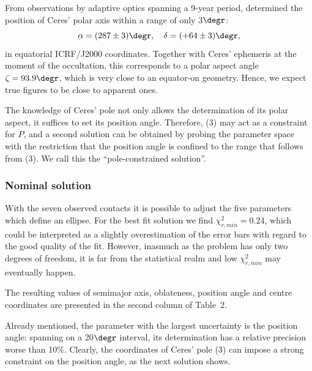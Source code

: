 \documentclass[useAMS,usenatbib]{mn2e}
\begin{document}
From observations by adaptive optics spanning a 9-year period, \cite{Drummond2014} determined the position of Ceres' polar axis within a range of only 3$\degr$:
\begin{equation}
\alpha = (287 \pm 3) \degr, \quad %
\delta = (+64 \pm 3) \degr,
\end{equation}
%
in equatorial ICRF/J2000 coordinates. Together with Ceres' ephemeris at the moment of the occultation, this corresponds to a polar aspect angle $\zeta = 93.9\degr$, which is very close to an equator-on geometry. Hence, we expect true figures to be close to apparent ones.

The knowledge of Ceres' pole not only allows the determination of its polar aspect, it suffices to set its position angle. Therefore, (3) may act as a constraint for $P$, and a second solution can be obtained by probing the parameter space with the restriction that the position angle is confined to the range that follows from (3). We call this the ``pole-constrained solution''.


\subsubsection{Nominal solution}

With the seven observed contacts it is possible to adjust the five parameters which define an ellipse. For the best fit solution we find $\chi^2_{r,min} = 0.24$, which could be interpreted as a slightly overestimation of the error bars with regard to the good quality of the fit. However, inasmuch as the problem has only two degrees of freedom, it is far from the statistical realm and low $\chi^2_{r,min}$ may eventually happen.

The resulting values of semimajor axis, oblateness, position angle and centre coordinates are presented in the second column of Table~2.%

Already mentioned, the parameter with the largest uncertainty is the position angle: spanning on a 20$\degr$ interval, its determination has a relative precision worse than 10$\%$. Clearly, the coordinates of Ceres' pole (3) can impose a strong constraint on the position angle, as the next solution shows.
\end{document}
